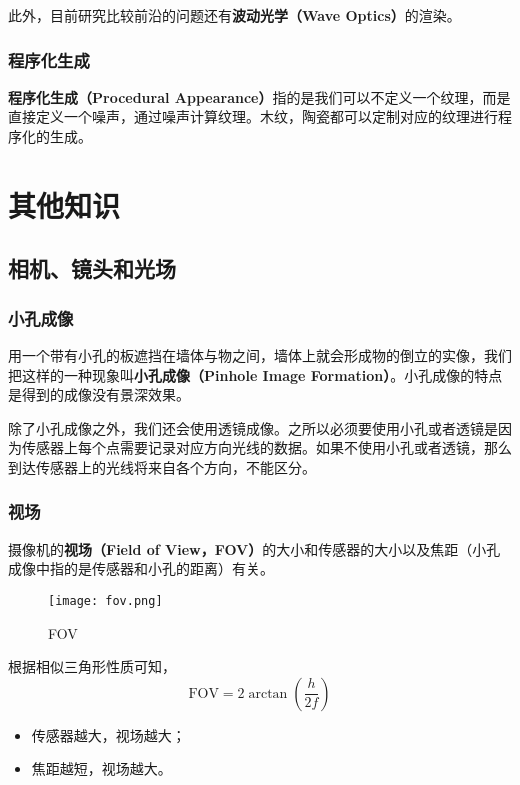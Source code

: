 \documentclass[openany]{progbookcn}
\begin{document}
此外，目前研究比较前沿的问题还有\textbf{波动光学（Wave Optics）}的渲染。

\section{程序化生成}

\textbf{程序化生成（Procedural Appearance）}指的是我们可以不定义一个纹理，而是直接定义一个噪声，通过噪声计算纹理。木纹，陶瓷都可以定制对应的纹理进行程序化的生成。

\part{其他知识}

\chapter{相机、镜头和光场}

\section{小孔成像}

用一个带有小孔的板遮挡在墙体与物之间，墙体上就会形成物的倒立的实像，我们把这样的一种现象叫\textbf{小孔成像（Pinhole Image Formation）}。小孔成像的特点是得到的成像没有景深效果。

除了小孔成像之外，我们还会使用透镜成像。之所以必须要使用小孔或者透镜是因为传感器上每个点需要记录对应方向光线的数据。如果不使用小孔或者透镜，那么到达传感器上的光线将来自各个方向，不能区分。

\section{视场}

摄像机的\textbf{视场（Field of View，FOV）}的大小和传感器的大小以及焦距（小孔成像中指的是传感器和小孔的距离）有关。

\begin{figure}[H]
	\centering
	\texttt{[image: fov.png]}
	\caption{FOV}
	\label{fig:fov}
\end{figure}

根据相似三角形性质可知，
\begin{equation}
	\text{FOV}=2\arctan(\frac{h}{2f})
\end{equation}

\begin{itemize}
	\item 传感器越大，视场越大；
	\item 焦距越短，视场越大。
\end{itemize}
\end{document}
